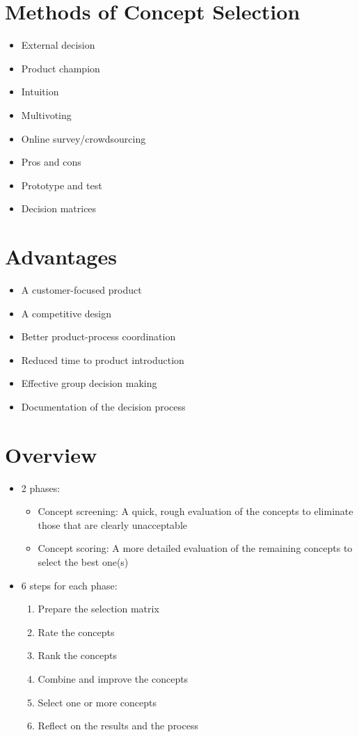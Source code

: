 \documentclass[a4paper,12pt,openany]{book}
\begin{document}
\section{Methods of Concept Selection}
\begin{itemize}
    \item External decision
    \item Product champion
    \item Intuition
    \item Multivoting
    \item Online survey/crowdsourcing
    \item Pros and cons
    \item Prototype and test
    \item Decision matrices
\end{itemize}
\section{Advantages}
\begin{itemize}
    \item A customer-focused product
    \item A competitive design
    \item Better product-process coordination
    \item Reduced time to product introduction
    \item Effective group decision making
    \item Documentation of the decision process
\end{itemize}
\section{Overview}
\begin{itemize}
    \item 2 phases:
    \begin{itemize}
        \item Concept screening: A quick, rough evaluation of the concepts to eliminate those that are clearly unacceptable
        \item Concept scoring: A more detailed evaluation of the remaining concepts to select the best one(s)
    \end{itemize}
    \item 6 steps for each phase:
    \begin{enumerate}
        \item Prepare the selection matrix
        \item Rate the concepts
        \item Rank the concepts
        \item Combine and improve the concepts
        \item Select one or more concepts
        \item Reflect on the results and the process
    \end{enumerate}
\end{itemize}
\end{document}

